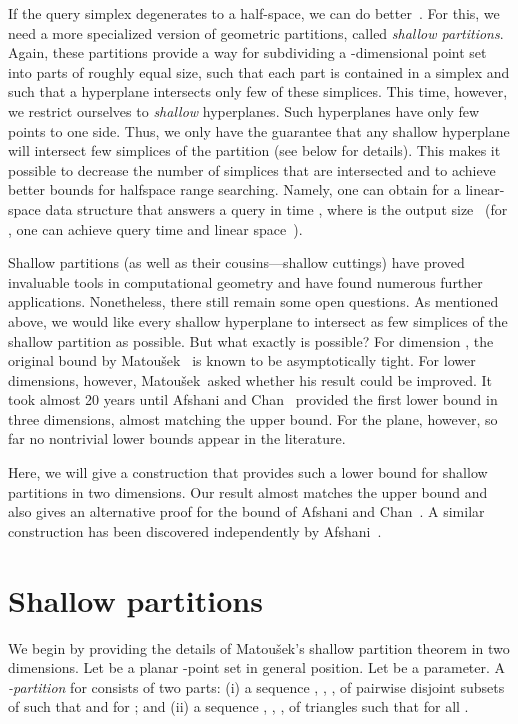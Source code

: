 \documentclass{paper}
\newcommand\matousek{{Matou{\v{s}}ek}}
\begin{document}
If the query simplex degenerates to a half-space, we can
do better~\cite{Matousek92}. For this, we need a more specialized version of
geometric partitions, called \emph{shallow partitions}. Again, these
partitions provide a way for subdividing a -dimensional point set into
parts of roughly equal size, such that each part is contained in a simplex and
such that a hyperplane intersects only few of these simplices. 
This time, however, we restrict ourselves to \emph{shallow} hyperplanes. 
Such hyperplanes have only few points to one side. 
Thus, we only have the guarantee
that any shallow hyperplane will intersect few simplices of the partition
(see below for details).
This makes it possible to decrease the number of simplices that are intersected 
and to achieve better bounds for halfspace range searching. Namely, one
can obtain for  a linear-space data structure that answers a query in time
, where  is the output 
size~\cite{Chan10} (for , one can achieve query time 
and linear space~\cite{AfshaniCh09}).

Shallow partitions (as well as their cousins---shallow cuttings) have proved
invaluable tools in computational geometry and have found numerous further
applications. Nonetheless, there still remain some open questions. 
As mentioned above, we would like every shallow hyperplane 
to intersect as few simplices of the shallow partition as possible.
But what exactly is possible? For dimension , the original bound
by \matousek~\cite{Matousek92b} is known to be asymptotically tight. For
lower dimensions, however, \matousek\ asked whether his result could be 
improved.
It took almost 20 years until Afshani and Chan~\cite{AfshaniCh09}
provided the first lower bound in three dimensions, almost
matching the upper bound. For the plane, however, so far no nontrivial
lower bounds appear in the literature. 

Here, we will give a construction that
provides such a lower bound for shallow partitions in two dimensions.
Our result almost matches the upper bound and also gives an alternative
proof for the bound of Afshani and Chan~\cite{AfshaniCh09}.
A similar construction has been discovered independently by
Afshani~\cite{Afshani10}.


\section{Shallow partitions}

We begin by providing the details of \matousek's shallow partition theorem
in two dimensions.
Let  be a planar -point set in general position.
Let  be a parameter. 
A \emph{-partition}  for  consists of two parts:
(i) a sequence , , ,  of
pairwise disjoint subsets of  such that 
and  for ; and
(ii) a sequence , , , 
of triangles such that  for all .
\end{document}
